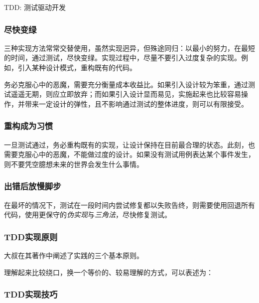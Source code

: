 \begin{content}
\begin{episode}{TDD: 测试驱动开发}
\begin{content}
\subsubsection{尽快变绿}

三种实现方法常常交替使用，虽然实现迥异，但殊途同归：以最小的努力，在最短的时间，通过测试，尽快变绿。实现过程中，尽量不要引入过度复杂的实现。例如，引入某种设计模式，重构既有的代码。

务必克服心中的恶魔，需要充分衡量成本收益比。如果引入设计较为笨重，通过测试遥遥无期，则应立即放弃；而如果引入设计显而易见，实施起来也比较容易操作，并带来一定设计的弹性，且不影响通过测试的整体进度，则可以有限接受。

\subsubsection{重构成为习惯}

一旦测试通过，务必重构既有的实现，让设计保持在目前最合理的状态。此刻，也需要克服心中的恶魔，不能做过度的设计。如果没有测试用例表达某个事件发生，则不要凭空臆想未来的世界会发生什么事情。

\subsubsection{出错后放慢脚步}

在最坏的情况下，测试在一段时间内尝试修复都以失败告终，则需要使用回退所有代码，使用更保守的\emph{伪实现}与\emph{三角法}，尽快修复测试。

\subsubsection{TDD实现原则}

大叔在其著作中阐述了实践的三个基本原则。

\begin{enum}
\end{enum}

理解起来比较绕口，换一个等价的、较易理解的方式，可以表述为：

\begin{enum}
\end{enum}

\subsubsection{TDD实现技巧}


\end{content}
\end{episode}
\end{content}

